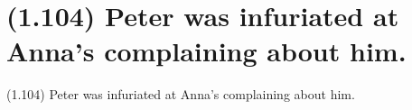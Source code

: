 \documentclass{article}
\begin{document}
\clearpage

%
%

\section*{(1.104) Peter was infuriated at Anna's complaining about him.}

\bigbreak
\begin{enumerate*}
\item[(1.104)] Peter was infuriated at Anna's complaining about him.
\end{enumerate*}
\bigbreak
\end{document}
